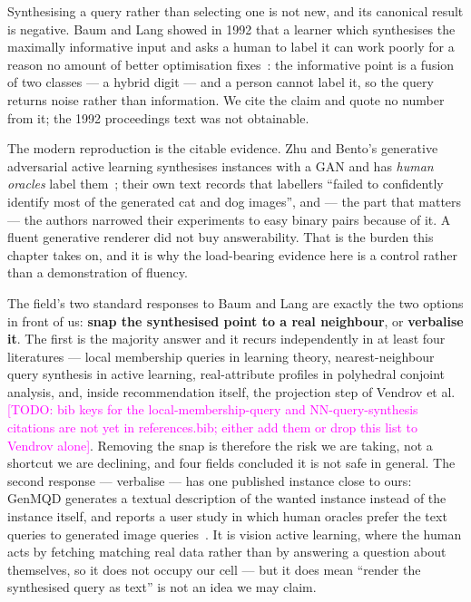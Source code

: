 \documentclass[11pt]{article}
\newcommand{\todo}[1]{\textcolor{magenta}{[TODO: #1]}}
\begin{document}
Synthesising a query rather than selecting one is not new, and its canonical result is negative. Baum
and Lang showed in 1992 that a learner which synthesises the maximally informative input and asks a
human to label it can work poorly for a reason no amount of better optimisation
fixes~\cite{baum1992query}: the informative point is a fusion of two classes --- a hybrid digit ---
and a person cannot label it, so the query returns noise rather than information. We cite the claim
and quote no number from it; the 1992 proceedings text was not obtainable.

The modern reproduction is the citable evidence. Zhu and Bento's generative adversarial active
learning synthesises instances with a GAN and has \emph{human oracles} label
them~\cite{zhu2017gaal}; their own text records that labellers ``failed to confidently identify most
of the generated cat and dog images'', and --- the part that matters --- the authors narrowed their
experiments to easy binary pairs because of it. A fluent generative renderer did not buy
answerability. That is the burden this chapter takes on, and it is why the load-bearing evidence here
is a control rather than a demonstration of fluency.

The field's two standard responses to Baum and Lang are exactly the two options in front of us:
\textbf{snap the synthesised point to a real neighbour}, or \textbf{verbalise it}. The first is the
majority answer and it recurs independently in at least four literatures --- local membership queries
in learning theory, nearest-neighbour query synthesis in active learning, real-attribute profiles in
polyhedral conjoint analysis, and, inside recommendation itself, the projection step of Vendrov et
al.~\cite{vendrov2020gradient} \todo{bib keys for the local-membership-query and NN-query-synthesis
citations are not yet in references.bib; either add them or drop this list to Vendrov alone}. Removing
the snap is therefore the risk we are taking, not a shortcut we are declining, and four fields
concluded it is not safe in general. The second response --- verbalise --- has one published instance
close to ours: GenMQD generates a textual description of the wanted instance instead of the instance
itself, and reports a user study in which human oracles prefer the text queries to generated image
queries~\cite{genmqd2024}. It is vision active learning, where the human acts by fetching matching
real data rather than by answering a question about themselves, so it does not occupy our cell --- but
it does mean ``render the synthesised query as text'' is not an idea we may claim.
\end{document}
